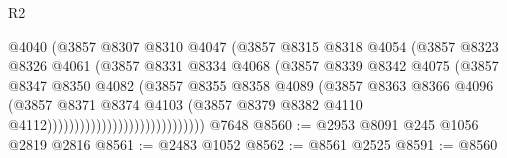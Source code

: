 \begin{lexlean}{R2}
\begin{coremodule}
                                          @4040
                                          (@3857
                                            @8307
                                            @8310
                                            @4047
                                            (@3857
                                              @8315
                                              @8318
                                              @4054
                                              (@3857
                                                @8323
                                                @8326
                                                @4061
                                                (@3857
                                                  @8331
                                                  @8334
                                                  @4068
                                                  (@3857
                                                    @8339
                                                    @8342
                                                    @4075
                                                    (@3857
                                                      @8347
                                                      @8350
                                                      @4082
                                                      (@3857
                                                        @8355
                                                        @8358
                                                        @4089
                                                        (@3857
                                                          @8363
                                                          @8366
                                                          @4096
                                                          (@3857
                                                            @8371
                                                            @8374
                                                            @4103
                                                            (@3857
                                                              @8379
                                                              @8382
                                                              @4110
                                                              @4112)))))))))))))))))))))))))))))
    @7648
@8560 := @2953 @8091 @245 @1056 @2819 @2816
@8561 := @2483 @1052
@8562 := @8561 @2525
@8591 := @8560

\end{coremodule}
\end{lexlean}
